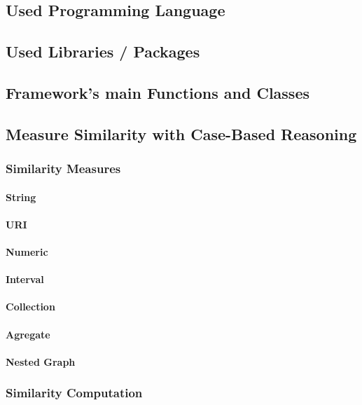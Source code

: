     
\subsection{Used Programming Language}

\subsection{Used Libraries / Packages}

\subsection{Framework's main Functions and Classes}

\subsection{Measure Similarity with Case-Based Reasoning}
    \subsubsection{Similarity Measures}
        \paragraph{String}
        \paragraph{URI}
        \paragraph{Numeric}
        \paragraph{Interval}
        \paragraph{Collection}
        \paragraph{Agregate}
        \paragraph{Nested Graph}
    
    \subsubsection{Similarity Computation}

